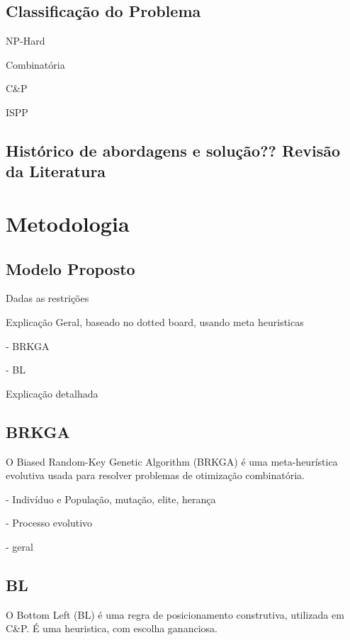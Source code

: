 \documentclass[a4paper, 12pt]{article}
\begin{document}
\subsection{Classificação do Problema}
\label{sub:classificacao}

NP-Hard

Combinatória

C&P

ISPP

\subsection{Histórico de abordagens e solução?? Revisão da Literatura}
\label{sub:historico}

\section{Metodologia}
\label{sec:metodologia}


\subsection{Modelo Proposto}
\label{sub:modelo}

Dadas as restrições

Explicação Geral, baseado no dotted board, usando meta heuristicas

- BRKGA

- BL

Explicação detalhada


\subsection{BRKGA}

O Biased Random-Key Genetic Algorithm (BRKGA) é uma meta-heurística  evolutiva usada para resolver problemas de otimização combinatória.

- Indivíduo e População, mutação, elite, herança

- Processo evolutivo

- geral



\subsection{BL}
\label{sub:modelo-base}

O Bottom Left (BL) é uma regra de posicionamento construtiva, utilizada em C&P. É uma heuristica, com escolha gananciosa.
\end{document}
